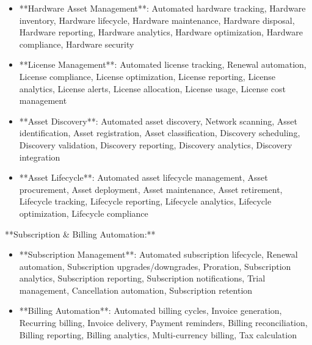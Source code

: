 \documentclass[11pt,a4paper]{article}
\begin{document}
\begin{itemize}
\item **Hardware Asset Management**: Automated hardware tracking, Hardware inventory, Hardware lifecycle, Hardware maintenance, Hardware disposal, Hardware reporting, Hardware analytics, Hardware optimization, Hardware compliance, Hardware security
\end{itemize}

\begin{itemize}
\item **License Management**: Automated license tracking, Renewal automation, License compliance, License optimization, License reporting, License analytics, License alerts, License allocation, License usage, License cost management
\end{itemize}

\begin{itemize}
\item **Asset Discovery**: Automated asset discovery, Network scanning, Asset identification, Asset registration, Asset classification, Discovery scheduling, Discovery validation, Discovery reporting, Discovery analytics, Discovery integration
\end{itemize}

\begin{itemize}
\item **Asset Lifecycle**: Automated asset lifecycle management, Asset procurement, Asset deployment, Asset maintenance, Asset retirement, Lifecycle tracking, Lifecycle reporting, Lifecycle analytics, Lifecycle optimization, Lifecycle compliance
\end{itemize}

**Subscription \& Billing Automation:**

\begin{itemize}
\item **Subscription Management**: Automated subscription lifecycle, Renewal automation, Subscription upgrades/downgrades, Proration, Subscription analytics, Subscription reporting, Subscription notifications, Trial management, Cancellation automation, Subscription retention
\end{itemize}

\begin{itemize}
\item **Billing Automation**: Automated billing cycles, Invoice generation, Recurring billing, Invoice delivery, Payment reminders, Billing reconciliation, Billing reporting, Billing analytics, Multi-currency billing, Tax calculation
\end{itemize}
\end{document}
